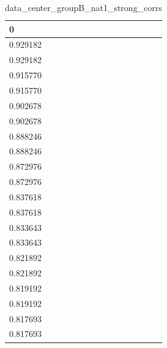\begin{table}
\caption{data_center_groupB_nat1_strong_corrs}
\label{tab:data_summary}
\begin{tabular}{lcr}
\toprule
0 \\
\midrule
0.929182 \\
0.929182 \\
0.915770 \\
0.915770 \\
0.902678 \\
0.902678 \\
0.888246 \\
0.888246 \\
0.872976 \\
0.872976 \\
0.837618 \\
0.837618 \\
0.833643 \\
0.833643 \\
0.821892 \\
0.821892 \\
0.819192 \\
0.819192 \\
0.817693 \\
0.817693 \\
\bottomrule
\end{tabular}
\end{table}
